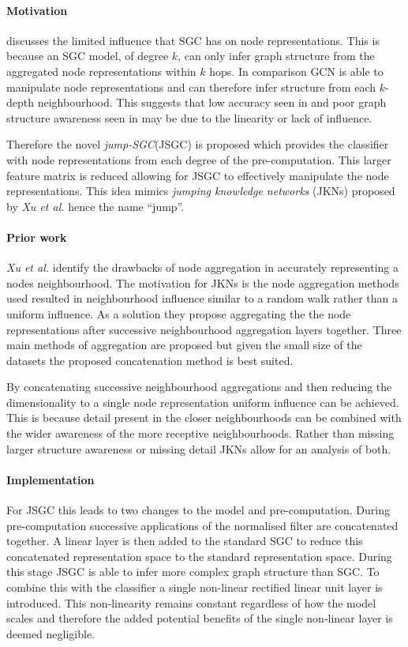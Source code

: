 \paragraph{Motivation}
 discusses the limited influence that SGC has on node representations.
This is because an SGC model, of degree $k$, can only infer graph structure from the aggregated node representations within $k$ hops.
In comparison GCN is able to manipulate node representations and can therefore infer structure from each $k$-depth neighbourhood.
This suggests that low accuracy seen in  and poor graph structure awareness seen in  may be due to the linearity or lack of influence.

Therefore the novel \emph{jump-SGC}(JSGC) is proposed which provides the classifier with node representations from each degree of the pre-computation.
This larger feature matrix is reduced allowing for JSGC to effectively manipulate the node representations.
This idea mimics \emph{jumping knowledge networks} (JKNs) proposed by \textit{Xu et al.}\cite{xu2018representation} hence the name ``jump''.

\paragraph{Prior work}
\textit{Xu et al.}\cite{xu2018representation} identify the drawbacks of node aggregation in accurately representing a nodes neighbourhood.
The motivation for JKNs is the node aggregation methods used resulted in neighbourhood influence similar to a random walk rather than a uniform influence.
As a solution they propose aggregating the the node representations after successive neighbourhood aggregation layers together.
Three main methods of aggregation are proposed but given the small size of the datasets the proposed concatenation method is best suited.

By concatenating successive neighbourhood aggregations and then reducing the dimensionality to a single node representation uniform influence can be achieved.
This is because detail present in the closer neighbourhoods can be combined with the wider awareness of the more receptive neighbourhoods.
Rather than missing larger structure awareness or missing detail JKNs allow for an analysis of both.

\paragraph{Implementation}
For JSGC this leads to two changes to the model and pre-computation.
During pre-computation successive applications of the normalised filter are concatenated together.
A linear layer is then added to the standard SGC to reduce this concatenated representation space to the standard representation space.
During this stage JSGC is able to infer more complex graph structure than SGC.
To combine this with the classifier a single non-linear rectified linear unit layer is introduced.
This non-linearity remains constant regardless of how the model scales and therefore the added potential benefits of the single non-linear layer is deemed negligible.

